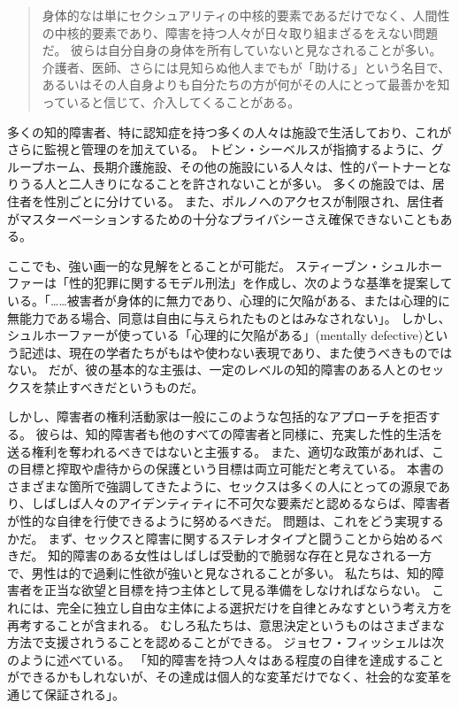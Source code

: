 \documentclass[paper=a4,book,openany]{jlreq}
\begin{document}
\begin{quote}
身体的なは単にセクシュアリティの中核的要素であるだけでなく、人間性の中核的要素であり、障害を持つ人々が日々取り組まざるをえない問題だ。
彼らは自分自身の身体を所有していないと見なされることが多い。
介護者、医師、さらには見知らぬ他人までもが「助ける」という名目で、あるいはその人自身よりも自分たちの方が何がその人にとって最善かを知っていると信じて、介入してくることがある。
\citep[p.218]{scott15:_can_disab_peopl_have_sex}
\end{quote}

多くの知的障害者、特に認知症を持つ多くの人々は施設で生活しており、これがさらに監視と管理のを加えている。
トビン・シーベルスが指摘するように、グループホーム、長期介護施設、その他の施設にいる人々は、性的パートナーとなりうる人と二人きりになることを許されないことが多い。
多くの施設では、居住者を性別ごとに分けている。
また、ポルノへのアクセスが制限され、居住者がマスターベーションするための十分なプライバシーさえ確保できないこともある\citep[p.45]{siebers12:_sexual_cultur_disab_peopl}。

ここでも、強い画一的な見解をとることが可能だ。
スティーブン・シュルホーファーは「性的犯罪に関するモデル刑法」を作成し、次のような基準を提案している。「……被害者が身体的に無力であり、心理的に欠陥がある、または心理的に無能力である場合、同意は自由に与えられたものとはみなされない」\citep[p.283]{schulhofer98:_unwan_sex}。
しかし、シュルホーファーが使っている「心理的に欠陥がある」(mentally defective)という記述は、現在の学者たちがもはや使わない表現であり、また使うべきものではない。
だが、彼の基本的な主張は、一定のレベルの知的障害のある人とのセックスを禁止すべきだというものだ。

しかし、障害者の権利活動家は一般にこのような包括的なアプローチを拒否する。
彼らは、知的障害者も他のすべての障害者と同様に、充実した性的生活を送る権利を奪われるべきではないと主張する。
また、適切な政策があれば、この目標と搾取や虐待からの保護という目標は両立可能だと考えている。
本書のさまざまな箇所で強調してきたように、セックスは多くの人にとっての源泉であり、しばしば人々のアイデンティティに不可欠な要素だと認めるならば、障害者が性的な自律を行使できるように努めるべきだ\citep{vehmas19:_person_profoun_intel_disab_their_right_sex,hollomotz10:_vulner_adult,evans09:_sexual_person_relat_peopl_intel_disab,kittay10:_person_is_philos_is_polit}。
問題は、これをどう実現するかだ。
まず、セックスと障害に関するステレオタイプと闘うことから始めるべきだ。
知的障害のある女性はしばしば受動的で脆弱な存在と見なされる一方で、男性は的で過剰に性欲が強いと見なされることが多い\citep{feely16:_sexual_surveil_contr_commun_based,gill15:_alread_doing_it,barrett14:_disab_mascul}。
私たちは、知的障害者を正当な欲望と目標を持つ主体として見る準備をしなければならない。
これには、完全に独立し自由な主体による選択だけを自律とみなすという考え方を再考することが含まれる。
むしろ私たちは、意思決定というものはさまざまな方法で支援されうることを認めることができる。
ジョセフ・フィッシェルは次のように述べている。
「知的障害を持つ人々はある程度の自律を達成することができるかもしれないが、その達成は個人的な変革だけでなく、社会的な変革を通じて保証される」\citep[p.146]{fischel18:screwconsent}。
\end{document}
